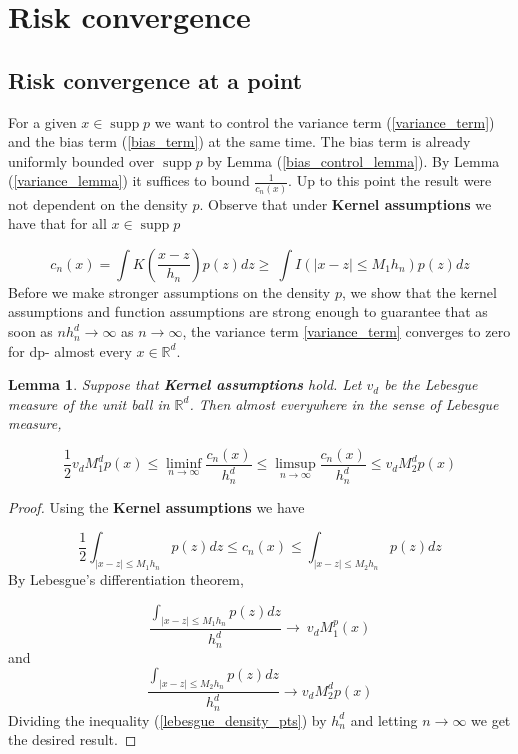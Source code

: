 \documentclass{article}
\newtheorem{lemma}[theorem]{Lemma}
\DeclareMathOperator\supp{supp}
\begin{document}
\section{Risk convergence}

\subsection{Risk convergence at a point}
For a given $x\in\supp{p}$ we want to control the variance term (\ref{variance_term}) and the bias term (\ref{bias_term}) at the same time. The bias term is already uniformly bounded over $\supp{p}$ by Lemma (\ref{bias_control_lemma}). By Lemma (\ref{variance_lemma}) it suffices to bound $\frac{1}{c_n(x)}$. Up to this point the result were not dependent on the density $p$. Observe that under \textbf{Kernel assumptions} we have that for all $x\in\supp{p}$ 

\begin{equation*}
    c_n(x)=\int K(\frac{x-z}{h_n})p(z)dz\geq \ \int I(|x-z|\leq M_1h_n)p(z)dz
\end{equation*}
Before we make stronger assumptions on the density $p$, we show that the kernel assumptions and function assumptions are strong enough to guarantee that as soon as $nh_n^d\to\infty$ as $n\to\infty$, the variance term \ref{variance_term} converges to zero for dp- almost every $x\in\mathbb{R}^d$.

\begin{lemma}
\label{Lebesgue_lemma}
Suppose that \textbf{Kernel assumptions} hold. Let $v_d$ be the Lebesgue measure of the unit ball in $\mathbb{R}^d$. Then almost everywhere in the sense of Lebesgue measure,

\begin{equation*}
 \frac{1}{2}v_dM_1^dp(x)\leq \liminf_{n\to\infty} \frac{c_n(x)}{h_n^d}\leq \limsup_{n\to\infty} \frac{c_n(x)}{h_n^d}\leq v_dM_2^dp(x)   
\end{equation*}

\end{lemma}

\begin{proof}
Using the \textbf{Kernel assumptions} we have

\begin{equation}
\label{lebesgue_density_pts}
    \frac{1}{2}\int_{|x-z|\leq M_1h_n}p(z)dz\leq c_n(x)\leq \int_{|x-z|\leq M_2h_n}p(z)dz
\end{equation}
By Lebesgue's differentiation theorem, 

\begin{equation}
\frac{\int_{|x-z|\leq M_1h_n}p(z)dz}{h_n^d}\to\ v_dM_1^p(x)
\end{equation}
and
\begin{equation}
\frac{\int_{|x-z|\leq M_2h_n}p(z)dz}{h_n^d}\to v_dM_2^dp(x)
\end{equation}
Dividing the inequality (\ref{lebesgue_density_pts}) by $h_n^d$ and letting $n\to\infty$ we get the desired result.

\end{proof}
\end{document}
